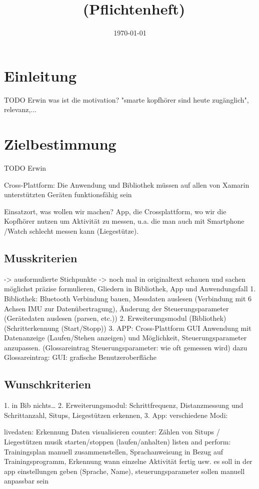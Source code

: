 \documentclass[a4paper,12pt]{article}
\title{\projektName~(Pflichtenheft)}
\author{\authorName}
\date{\today}
\begin{document}
 \setcounter{page}{2}
 \tableofcontents          %
 \clearpage

\section{Einleitung}
TODO Erwin
was ist die motivation? "smarte kopfhörer sind heute zugänglich", relevanz,...
\section{Zielbestimmung}
TODO Erwin

Cross-Plattform:    Die Anwendung und Bibliothek müssen auf allen von Xamarin unterstützten Geräten funktionsfähig sein

Einsatzort, was wollen wir machen? App, die Crossplattform, wo wir die Kopfhörer nutzen um 
Aktivität zu messen, u.a. die man auch mit Smartphone /Watch schlecht messen kann (Liegestütze).
\subsection{Musskriterien}
-> ausformulierte Stichpunkte
-> noch mal in originaltext schauen und sachen möglichst präzise formulieren, Gliedern in Bibliothek, App und Anwendungsfall
1. Bibliothek: Bluetooth Verbindung bauen, Messdaten auslesen (Verbindung mit 6 Achsen IMU zur Datenübertragung), Änderung der Steuerungsparameter 
(Gerätedaten auslesen (parsen, etc.))
2. Erweiterungsmodul (Bibliothek) (Schritterkennung (Start/Stopp))
3. APP: Cross-Plattform GUI Anwendung mit Datenanzeige (Laufen/Stehen anzeigen) und Möglichkeit, Steuerungsparameter anzupassen. (Glossareintrag Steuerungsparameter: wie oft gemessen wird)
dazu Glossareintrag: GUI:        grafische Benutzeroberfläche
\subsection{Wunschkriterien}
1. in Bib nichts\dots
2. Erweiterungsmodul: Schrittfrequenz, Distanzmessung und Schrittanzahl, Situps, Liegestützen erkennen, 
3. App: verschiedene Modi: 

  livedaten: Erkennung Daten visualisieren
  counter: Zählen von Situps / Liegestützen
  musik starten/stoppen (laufen/anhalten)
	listen and perform: Trainingsplan manuell zusammenstellen, Sprachanweisung in Bezug auf Trainingsprogramm, Erkennung wann einzelne Aktivität fertig usw. 
  es soll in der app einstellungen geben (Sprache, Name), steuerungsparameter sollen manuell anpassbar sein
\end{document}
